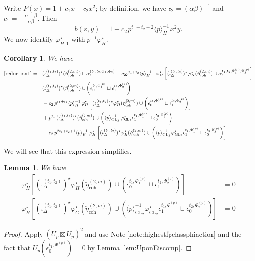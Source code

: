 \documentclass[cjm]{ipart}
\theoremstyle{plain}
\newtheorem{lemma}[theorem]{Lemma}
\newtheorem{corollary}[theorem]{Corollary}
\theoremstyle{remark}
\DeclareMathOperator{\coh}{coh}
\DeclareMathOperator{\GL}{GL}
\numberwithin{equation}{subsection}
\begin{document}
    Write $P(x)=1+c_1x+c_2x^2$; by definition, we have $c_2=(\alpha\beta)^{-1}$ and $c_1=-\frac{\alpha+\beta}{\alpha\beta}$. Then
    \[ b(x,y)=1-c_2\,p^{t_1+t_2+2}\langle p\rangle_H^{-1}\, x^2y.\]
    We  now identify $\varphi_{H,1}^\star$ with $p^{-1}\varphi_H^\star$.

    \begin{corollary}
     We have
     \begin{align}
      \text{\eqref{reduction1}} =\quad  & (\iota^{(t_1,t_2)}_\Delta)^\star(\breve\eta^{(2,m)}_{\coh})\cup \alpha^{(t_1,t_2,\Phi_1,\Phi_2)}_1-c_2p^{t_1+t_2}\langle p\rangle_H^{-1}\cdot \varphi_H^\star\left[(\iota^{(t_1,t_2)}_\Delta)^\star\varphi_H^\star(\breve\eta^{(2,m)}_{\coh})\cup \alpha^{t_1,t_2,\Phi^{(p)}_1,\Phi^{(p)}_2}_1\right]\notag\\
      =\quad&   (\iota^{(t_1,t_2)}_\Delta)^\star(\breve\eta^{(2,m)}_{\coh})\cup \left(\epsilon^{t_1,\Phi^{(p)}_1}_0\sqcup \epsilon^{t_2,\Phi^{(p)}_2}_1\right) \label{1stterm}\\
      &  -c_2\,p^{t_1+t_2}\langle p\rangle_H^{-1}\, \varphi_H^\star\left[(\iota^{(t_1,t_2)}_\Delta)^\star\varphi_H^\star(\breve\eta^{(2,m)}_{\coh})\cup \left(\epsilon^{t_1,\Phi^{(p)}_1}_0\sqcup \epsilon^{t_2,\Phi^{(p)}_2}_1\right)\right]\label{2ndterm}\\
      & +p^{t_1}\, (\iota^{(t_1,t_2)}_\Delta)^\star(\breve\eta^{(2,m)}_{\coh})\cup  \left( \langle p\rangle_{\GL_2}^{-1}\, \varphi_{\GL_2}^\star\epsilon^{t_1,\Phi^{(p)}_1}_1\sqcup\epsilon^{t_2,\Phi^{(p)}_2}_0\right)\label{3rdterm}\\
      & -c_2\,p^{2t_1+t_2+1}\langle p\rangle_H^{-1}\,\varphi_H^\star\left[ (\iota^{(t_1,t_2)}_\Delta)^\star\varphi_H^\star(\breve\eta^{(2,m)}_{\coh})\cup  \left( \langle p\rangle_{\GL_2}^{-1}\,\varphi_{\GL_2}^\star\epsilon^{t_1,\Phi^{(p)}_1}_1\sqcup \epsilon^{t_2,\Phi^{(p)}_2}_0\right)\right].\label{4thterm}
     \end{align}
    \end{corollary}

    We will see that this expression simplifies.

    \begin{lemma}
     We have
     \begin{align*}
       \varphi_H^\star\left[(\iota^{(t_1,t_2)}_\Delta)^\star\varphi_H^\star(\breve\eta^{(2,m)}_{\coh})\cup \left(\epsilon^{t_1,\Phi^{(p)}_1}_0\sqcup \epsilon^{t_2,\Phi^{(p)}_2}_1\right)\right]&=0\\
       \varphi_H^\star\left[ (\iota^{(t_1,t_2)}_\Delta)^\star\varphi_G^\star(\breve\eta^{(2,m)}_{\coh})\cup  \left(\langle p\rangle_{\GL_2}^{-1}\varphi_{\GL_2}^\star\epsilon^{t_1,\Phi^{(p)}_1}_1\sqcup \epsilon^{t_2,\Phi^{(p)}_2}_0\right)\right]&=0
      \end{align*}
    \end{lemma}
    \begin{proof}
     Apply $(U_p\boxtimes U_p)^2$ and use Note \ref{note:highestfpclassphiaction} and the fact that $U_p\left(\epsilon^{t_1,\Phi^{(p)}_1}_0\right)=0$ by Lemma \ref{lem:UponEiscomp}.
    \end{proof}
\end{document}
